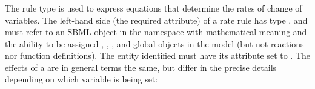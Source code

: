 \subsubsection{}
\label{sec:raterule}

The rule type \RateRule is used to express equations that
determine the rates of change of variables.  The left-hand side
(the required  attribute) of a rate rule  has type , and must refer to an SBML object in the  namespace with mathematical meaning and the ability to be assigned
\Species, \SpeciesReference, \Compartment, 
and global \Parameter objects in
the model (but not reactions nor function definitions).  The
entity identified must have its  attribute set to
.  The effects of a \RateRule are in general terms the
same, but differ in the precise details depending on which
variable is being set:

